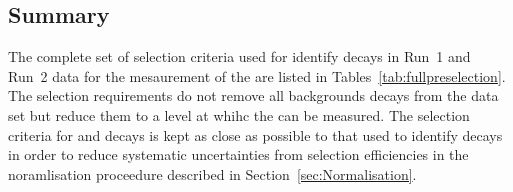 \subsection{Summary}
\label{sec:BFsummary}
The complete set of selection criteria used for identify \bmumu decays in Run~1 and Run~2 data for the mesaurement of the \bmumu \BFs are listed in Tables~\ref{tab:fullpreselection}.%
The selection requirements do not remove all backgrounds decays from the data set but reduce them to a level at whihc the \BFs can be measured. The selection criteria for \bhh and \bujpsik decays is kept as close as possible to that used to identify \bmumu decays in order to reduce systematic uncertainties from selection efficiencies in the noramlisation proceedure described in Section~\ref{sec:Normalisation}. 
